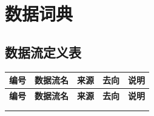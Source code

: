 \documentclass[12pt,a4paper,UTF8]{article}
\begin{document}
\section{数据词典}

\subsection{数据流定义表}

\renewcommand{\arraystretch}{1.45}

\begin{xltabular}{\linewidth}{
  |>{\centering\arraybackslash}m{1cm}
  |>{\centering\arraybackslash}m{3.5cm}
  |>{\centering\arraybackslash}m{3cm}
  |>{\centering\arraybackslash}m{3cm}
  |>{\centering\arraybackslash}m{5cm}|}
  \hline
  \textbf{编号} & \textbf{数据流名} & \textbf{来源} & \textbf{去向} & \textbf{说明} \\ \hline \endfirsthead
  \hline
  \textbf{编号} & \textbf{数据流名} & \textbf{来源} & \textbf{去向} & \textbf{说明} \\ \hline \endhead
  \hline
   \\ \endfoot
  \hline \endlastfoot


\end{xltabular}
\end{document}
